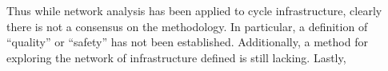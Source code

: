 \documentclass[11pt]{article} %
\begin{document}
Thus while network analysis has been applied to cycle infrastructure, clearly there is not a consensus on the methodology. In particular, a definition of ``quality'' or ``safety'' has not been established. Additionally, a method for exploring the network of infrastructure defined is still lacking. Lastly,  

%
%
\end{document}
